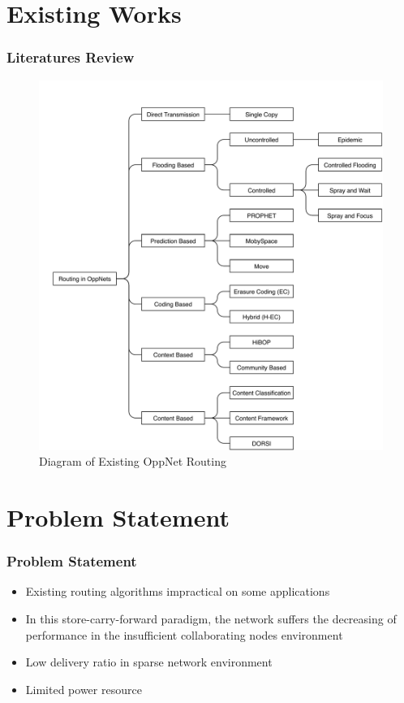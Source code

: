 \documentclass{beamer}
\begin{document}
\section{Existing Works}
\begin{frame}
	\frametitle{Literatures Review}
	\begin{figure}
		\centering
		\includegraphics[width=0.5\linewidth]{Figures_Present/RoutingInOppNets}
		\caption{Diagram of Existing OppNet Routing}
		\label{fig:RoutingInOppNets}
	\end{figure}
	
\end{frame}


\section{Problem Statement}
\begin{frame}
\frametitle{Problem Statement}


\begin{itemize}
\item Existing routing algorithms impractical on some applications
\item In this store-carry-forward paradigm, the network suffers the decreasing of performance in the insufficient collaborating nodes environment \cite{6196145,Spyropoulos2010}
\item Low delivery ratio in sparse network environment
\item Limited power resource 

\end{itemize}
\end{frame}
\end{document}

